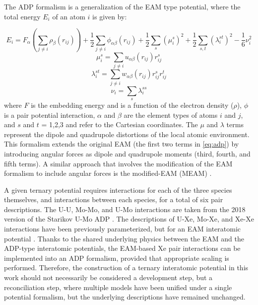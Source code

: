 \documentclass[review]{elsarticle}
\begin{document}
The ADP \cite{mishin2005} formalism is a generalization of the EAM type potential, where the total energy $E_i$ of an atom $i$ is given by:

\begin{equation}\label{eq:adp}
E_i = F_{\alpha} \left( \sum\limits_{j\neq i} \rho_{\beta}(r_{ij}) \right) + \frac{1}{2}\sum\limits_{j \neq i} \phi_{\alpha \beta}(r_{ij}) + \frac{1}{2}\sum\limits_{s}(\mu_i^s)^2 + \frac{1}{2}\sum\limits_{s,t}(\lambda_i^{st})^2 - \frac{1}{6}\nu_i^2 
\end{equation}
\begin{equation}
\mu_i^s = \sum\limits_{j \neq i} u_{\alpha \beta}(r_{ij})r_{ij}^s
\end{equation}
\begin{equation}
\lambda_i^{st} = \sum\limits_{j \neq i} w_{\alpha \beta}(r_{ij})r_{ij}^s r_{ij}^t
\end{equation}
\begin{equation}
\nu_i = \sum\limits_{s} \lambda_i^{ss} 
\end{equation}
\noindent where $F$ is the embedding energy and is a function of the electron density ($\rho$), $\phi$ is a pair potential interaction, $\alpha$ and $\beta$ are the element types of atoms $i$ and $j$, and $s$ and $t$ = 1,2,3 and refer to the Cartesian coordinates. The $\mu$ and $\lambda$ terms represent the dipole and quadrupole distortions of the local atomic environment. This formalism extends the original EAM (the first two terms in \cref{eq:adp}) by introducing angular forces as dipole and quadrupole moments (third, fourth, and fifth terms). A similar approach that involves the modification of the EAM formalism to include angular forces is the modified-EAM (MEAM) \cite{baskes1989,baskes1992}. 

A given ternary potential requires interactions for each of the three species themselves, and interactions between each species, for a total of six pair descriptions. The U-U, Mo-Mo, and U-Mo interactions are taken from the 2018 version of the Starikov U-Mo ADP \cite{starikov2018}. The descriptions of U-Xe, Mo-Xe, and Xe-Xe interactions have been previously parameterized, but for an EAM interatomic potential \cite{smirnovaUMoXe}. Thanks to the shared underlying physics between the EAM and the ADP-type interatomic potentials, the EAM-based Xe pair interactions can be implemented into an ADP formalism, provided that appropriate scaling is performed. Therefore, the construction of a ternary interatomic potential in this work should not necessarily be considered a development step, but a reconciliation step, where multiple models have been unified under a single potential formalism, but the underlying descriptions have remained unchanged. 
\end{document}

